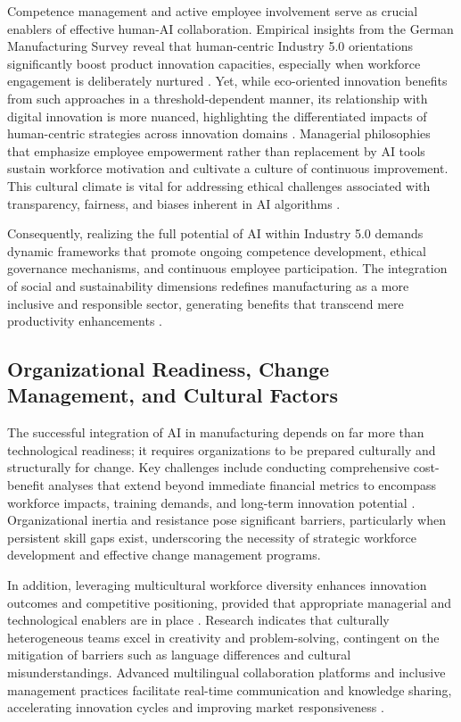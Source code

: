 \documentclass[sigconf]{acmart}
\begin{document}
Competence management and active employee involvement serve as crucial enablers of effective human-AI collaboration. Empirical insights from the German Manufacturing Survey reveal that human-centric Industry 5.0 orientations significantly boost product innovation capacities, especially when workforce engagement is deliberately nurtured \cite{ref6}. Yet, while eco-oriented innovation benefits from such approaches in a threshold-dependent manner, its relationship with digital innovation is more nuanced, highlighting the differentiated impacts of human-centric strategies across innovation domains \cite{ref7}. Managerial philosophies that emphasize employee empowerment rather than replacement by AI tools sustain workforce motivation and cultivate a culture of continuous improvement. This cultural climate is vital for addressing ethical challenges associated with transparency, fairness, and biases inherent in AI algorithms \cite{ref9,ref15,ref36}.

Consequently, realizing the full potential of AI within Industry 5.0 demands dynamic frameworks that promote ongoing competence development, ethical governance mechanisms, and continuous employee participation. The integration of social and sustainability dimensions redefines manufacturing as a more inclusive and responsible sector, generating benefits that transcend mere productivity enhancements \cite{ref38}.

\subsection{Organizational Readiness, Change Management, and Cultural Factors}

The successful integration of AI in manufacturing depends on far more than technological readiness; it requires organizations to be prepared culturally and structurally for change. Key challenges include conducting comprehensive cost-benefit analyses that extend beyond immediate financial metrics to encompass workforce impacts, training demands, and long-term innovation potential \cite{ref3}. Organizational inertia and resistance pose significant barriers, particularly when persistent skill gaps exist, underscoring the necessity of strategic workforce development and effective change management programs.

In addition, leveraging multicultural workforce diversity enhances innovation outcomes and competitive positioning, provided that appropriate managerial and technological enablers are in place \cite{ref16}. Research indicates that culturally heterogeneous teams excel in creativity and problem-solving, contingent on the mitigation of barriers such as language differences and cultural misunderstandings. Advanced multilingual collaboration platforms and inclusive management practices facilitate real-time communication and knowledge sharing, accelerating innovation cycles and improving market responsiveness \cite{ref17,ref19}.
\end{document}
